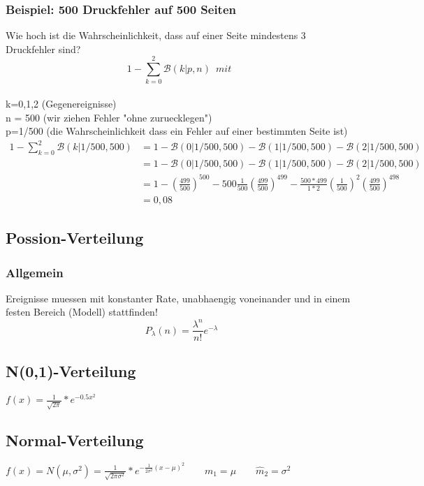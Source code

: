 \documentclass{article}
\begin{document}
	\subsubsection{Beispiel: 500 Druckfehler auf 500 Seiten}
		Wie hoch ist die Wahrscheinlichkeit, dass auf einer Seite mindestens 3 Druckfehler
		sind?
		\[
			1- \sum_{k=0}^{2} \mathcal{B}(k|p,n) \enspace mit \enspace \] \\
			k=0,1,2 (Gegenereignisse)\\ n = 500 
			(wir ziehen Fehler "ohne zuruecklegen") \\ p=1/500 (die Wahrscheinlichkeit dass 
			ein Fehler auf einer bestimmten Seite ist)\\
		\begin{equation*}
		\begin{split}
			1- \sum_{k=0}^{2} \mathcal{B}(k|1/500,500)& = 1 - \mathcal{B}(0|1/500,500) - \mathcal{B}(1|1/500,500) - \mathcal{B}(2|
			1/500,500) \\
			& = 1 -  \mathcal{B}(0|1/500,500) - \mathcal{B}(1|1/500,500) - \mathcal{B}(2|
			1/500,500) \\
			& = 1 - \left( \frac{499}{500} \right) ^{500} - 500\frac{1}{500}\left(\frac{499}{500}\right)^{499} - \frac{500*499}{1*2}\left( \frac{1}{500} \right) ^2 \left( \frac{499}{500} \right) ^{498} \\ & = 0,08
		\end{split}
		\end{equation*}
	\subsection{Possion-Verteilung}
	\subsubsection{Allgemein}
	Ereignisse muessen mit konstanter Rate, unabhaengig voneinander und in einem festen 
	Bereich (Modell) stattfinden!
	\[
		P_{\lambda}(n) = \frac{\lambda ^n}{n!} e ^{- \lambda}
	\]
\subsection{N(0,1)-Verteilung}
	$f(x) = \frac{1}{\sqrt{2\pi}}*e^{-0.5x^2}$
\subsection{Normal-Verteilung}
	$f(x) = N(\mu, \sigma^2) = \frac{1}{\sqrt{2\pi\sigma^2}}*e^{-\frac{1}{2\sigma^2}(x-		
	\mu)^2} \quad \quad m_1 = \mu \quad \quad \widehat{m}_2=\sigma^2$
\end{document}
